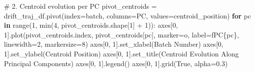 \documentclass[
  letterpaper,
  DIV=11,
  numbers=noendperiod]{scrartcl}
\newenvironment{Shaded}{\begin{snugshade}}{\end{snugshade}}
\newcommand{\BuiltInTok}[1]{\textcolor[rgb]{0.00,0.23,0.31}{#1}}
\newcommand{\CommentTok}[1]{\textcolor[rgb]{0.37,0.37,0.37}{#1}}
\newcommand{\ControlFlowTok}[1]{\textcolor[rgb]{0.00,0.23,0.31}{\textbf{#1}}}
\newcommand{\DecValTok}[1]{\textcolor[rgb]{0.68,0.00,0.00}{#1}}
\newcommand{\FloatTok}[1]{\textcolor[rgb]{0.68,0.00,0.00}{#1}}
\newcommand{\KeywordTok}[1]{\textcolor[rgb]{0.00,0.23,0.31}{\textbf{#1}}}
\newcommand{\NormalTok}[1]{\textcolor[rgb]{0.00,0.23,0.31}{#1}}
\newcommand{\OperatorTok}[1]{\textcolor[rgb]{0.37,0.37,0.37}{#1}}
\newcommand{\SpecialCharTok}[1]{\textcolor[rgb]{0.37,0.37,0.37}{#1}}
\newcommand{\SpecialStringTok}[1]{\textcolor[rgb]{0.13,0.47,0.30}{#1}}
\newcommand{\StringTok}[1]{\textcolor[rgb]{0.13,0.47,0.30}{#1}}
\newcommand{\VariableTok}[1]{\textcolor[rgb]{0.07,0.07,0.07}{#1}}
\renewenvironment{Shaded}{%
  \begin{tcolorbox}[%
    enhanced,%
    colback=codebg,%
    colframe=codebg,%
    borderline west={3pt}{0pt}{sectionblue},%
    fontupper=\small\ttfamily,%
    boxrule=0pt,%
    arc=0pt,%
    boxsep=5pt,%
    left=2mm,%
    right=2mm,%
    top=2mm,%
    bottom=2mm%
  ]%
}{%
  \end{tcolorbox}%
}
\begin{document}
\begin{Shaded}
\begin{Highlighting}[]
\CommentTok{\# 2. Centroid evolution per PC}
\NormalTok{pivot\_centroids }\OperatorTok{=}\NormalTok{ drift\_traj\_df.pivot(index}\OperatorTok{=}\StringTok{\textquotesingle{}batch\textquotesingle{}}\NormalTok{, columns}\OperatorTok{=}\StringTok{\textquotesingle{}PC\textquotesingle{}}\NormalTok{, values}\OperatorTok{=}\StringTok{\textquotesingle{}centroid\_position\textquotesingle{}}\NormalTok{)}
\ControlFlowTok{for}\NormalTok{ pc }\KeywordTok{in} \BuiltInTok{range}\NormalTok{(}\DecValTok{1}\NormalTok{, }\BuiltInTok{min}\NormalTok{(}\DecValTok{4}\NormalTok{, pivot\_centroids.shape[}\DecValTok{1}\NormalTok{] }\OperatorTok{+} \DecValTok{1}\NormalTok{)):}
\NormalTok{    axes[}\DecValTok{0}\NormalTok{, }\DecValTok{1}\NormalTok{].plot(pivot\_centroids.index, pivot\_centroids[pc], }
\NormalTok{                   marker}\OperatorTok{=}\StringTok{\textquotesingle{}o\textquotesingle{}}\NormalTok{, label}\OperatorTok{=}\SpecialStringTok{f\textquotesingle{}PC}\SpecialCharTok{\{}\NormalTok{pc}\SpecialCharTok{\}}\SpecialStringTok{\textquotesingle{}}\NormalTok{, linewidth}\OperatorTok{=}\DecValTok{2}\NormalTok{, markersize}\OperatorTok{=}\DecValTok{8}\NormalTok{)}
\NormalTok{axes[}\DecValTok{0}\NormalTok{, }\DecValTok{1}\NormalTok{].set\_xlabel(}\StringTok{\textquotesingle{}Batch Number\textquotesingle{}}\NormalTok{)}
\NormalTok{axes[}\DecValTok{0}\NormalTok{, }\DecValTok{1}\NormalTok{].set\_ylabel(}\StringTok{\textquotesingle{}Centroid Position\textquotesingle{}}\NormalTok{)}
\NormalTok{axes[}\DecValTok{0}\NormalTok{, }\DecValTok{1}\NormalTok{].set\_title(}\StringTok{\textquotesingle{}Centroid Evolution Along Principal Components\textquotesingle{}}\NormalTok{)}
\NormalTok{axes[}\DecValTok{0}\NormalTok{, }\DecValTok{1}\NormalTok{].legend()}
\NormalTok{axes[}\DecValTok{0}\NormalTok{, }\DecValTok{1}\NormalTok{].grid(}\VariableTok{True}\NormalTok{, alpha}\OperatorTok{=}\FloatTok{0.3}\NormalTok{)}


\end{Highlighting}
\end{Shaded}
\end{document}

